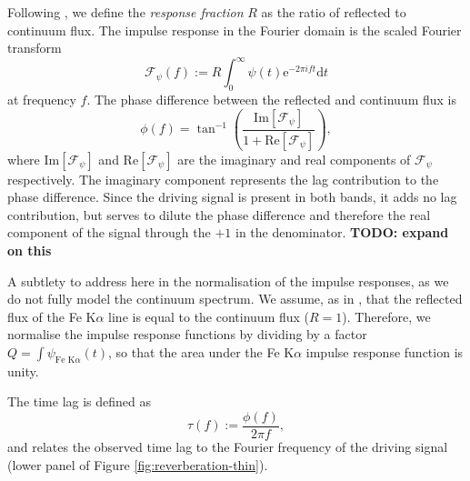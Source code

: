 \documentclass[fleqn,usenatbib]{mnras}
\newcommand{\todo}[1]{{\noindent \bf \color{red} TODO: #1}}
\newcommand{\FeKa}{Fe K$\alpha$\xspace}
\newcommand{\e}{\text{e}}
\renewcommand{\d}{\text{d}}
\renewcommand{\Im}[1]{\text{Im}\left[#1\right]}
\renewcommand{\Re}[1]{\text{Re}\left[#1\right]}
\begin{document}
Following \cite{cackett_modelling_2014}, we define the \textit{response
fraction} $R$ as the ratio of reflected to continuum flux. The impulse response
in the Fourier domain is the scaled Fourier transform
\begin{equation}
	\mathscr{F}_\psi(f) := R \int_{0}^\infty \psi(t) \e^{-2\pi i f t} \d t
\end{equation}
at frequency $f$.
The phase difference between the reflected and continuum flux is
\begin{equation}
	\phi(f) = \tan^{-1} \left(
		\frac{\Im{\mathscr{F}_\psi}}{1 + \Re{\mathscr{F}_\psi}}
	\right),
\end{equation}
where $\Im{\mathscr{F}_\psi}$ and $\Re{\mathscr{F}_\psi}$ are the imaginary and
real components of $\mathscr{F}_\psi$ respectively. The imaginary component
represents the lag contribution to the phase difference. Since the driving
signal is present in both bands, it adds no lag contribution, but serves to
dilute the phase difference and therefore the real component of the signal
through the $+1$ in the denominator. \todo{expand on this}

A subtlety to address here in the normalisation of the impulse responses, as we
do not fully model the continuum spectrum. We assume, as in
\cite{cackett_modelling_2014}, that the reflected flux of the Fe
K$\alpha$ line is equal to the continuum flux ($R = 1$). Therefore, we normalise
the impulse response functions by dividing by a factor $Q = \int \psi_{\text{Fe
K}\alpha}(t)$, so that the area under the \FeKa impulse response function
is unity.


The time lag is defined as
\begin{equation}
	\tau(f) := \frac{\phi(f)}{2 \pi f},
\end{equation}
and relates the observed time lag to the Fourier frequency of the driving signal (lower panel of Figure \ref{fig:reverberation-thin}).
\end{document}

